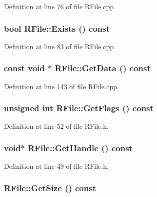 Definition at line 76 of file RFile.cpp.\hypertarget{class_r_file_72ab94152a88ad19b3c4db258bf49cb0}{
\subsubsection[{Exists}]{\setlength{\rightskip}{0pt plus 5cm}bool RFile::Exists () const}}
\label{class_r_file_72ab94152a88ad19b3c4db258bf49cb0}




Definition at line 83 of file RFile.cpp.\hypertarget{class_r_file_4958bbe180b2c4544968b4ee6975acbe}{
\subsubsection[{GetData}]{\setlength{\rightskip}{0pt plus 5cm}const void $\ast$ RFile::GetData () const}}
\label{class_r_file_4958bbe180b2c4544968b4ee6975acbe}




Definition at line 143 of file RFile.cpp.\hypertarget{class_r_file_a7a3a5a24e39a081e7198024b71e96a2}{
\subsubsection[{GetFlags}]{\setlength{\rightskip}{0pt plus 5cm}unsigned int RFile::GetFlags () const}}
\label{class_r_file_a7a3a5a24e39a081e7198024b71e96a2}




Definition at line 52 of file RFile.h.\hypertarget{class_r_file_27601647d44f5232a50d32f81570a093}{
\subsubsection[{GetHandle}]{\setlength{\rightskip}{0pt plus 5cm}void$\ast$ RFile::GetHandle () const}}
\label{class_r_file_27601647d44f5232a50d32f81570a093}




Definition at line 49 of file RFile.h.\hypertarget{class_r_file_8159fd984526bc46e8942a8e1ca3c10c}{
\subsubsection[{GetSize}]{ RFile::GetSize () const}}
\label{class_r_file_8159fd984526bc46e8942a8e1ca3c10c}




